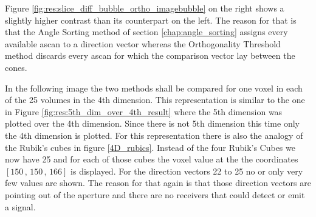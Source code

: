Figure \ref{fig:res:slice_diff_bubble_ortho_imagebubble} on the right shows a slightly higher contrast than its counterpart on the left. The reason for that is that the Angle Sorting method of section \ref{chap:angle_sorting} assigns every available \ac{ascan} to a direction vector whereas the Orthogonality Threshold method discards every \ac{ascan} for which the comparison vector lay between the cones. 

\bigskip

In the following image the two methods shall be compared for one voxel in each of the 25 volumes in the 4th dimension. This representation is similar to the one in Figure \ref{fig:res:5th_dim_over_4th_result} where the 5th dimension was plotted over the 4th dimension. Since there is not 5th dimension this time only the 4th dimension is plotted. For this representation there is also the analogy of the Rubik's cubes in figure \ref{4D_rubics}. Instead of the four Rubik's Cubes we now have 25 and for each of those cubes the voxel value at the the coordinates $[150\, , \, 150\, , \, 166]$ is displayed. For the direction vectors 22 to 25 no or only very few values are shown. The reason for that again is that those direction vectors are pointing out of the aperture and there are no receivers that could detect or emit a signal. 


